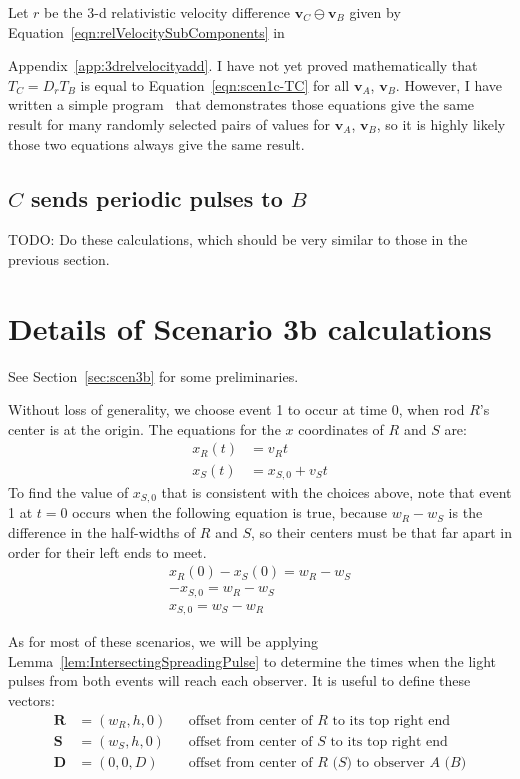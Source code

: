 \documentclass[a4paper]{article}
\theoremstyle{plain}
\theoremstyle{definition}
\newcommand{\vect}[1]{\mathbf{#1}}
\begin{document}
Let $r$ be the 3-d relativistic velocity difference
$\vect{v}_C \ominus \vect{v}_B$ given by
Equation~\eqref{eqn:relVelocitySubComponents} in

Appendix~\ref{app:3drelvelocityadd}.  I have not yet proved
mathematically that $T_C = D_r T_B$ is equal to
Equation~\eqref{eqn:scen1c-TC} for all $\vect{v}_A$, $\vect{v}_B$.
However, I have written a simple
program~\cite{FingerhutScenario1c-program} that demonstrates those
equations give the same result for many randomly selected pairs of
values for $\vect{v}_A$, $\vect{v}_B$, so it is highly likely those
two equations always give the same result.


\subsection{$C$ sends periodic pulses to $B$}
\label{app:scen1c-Csending}

TODO: Do these calculations, which should be very similar to those in
the previous section.


\section{Details of Scenario 3b calculations}
\label{app:scen3b}

See Section~\ref{sec:scen3b} for some preliminaries.

Without loss of generality, we choose event 1 to occur at time 0, when
rod $R$'s center is at the origin.  The equations for the $x$
coordinates of $R$ and $S$ are:
\begin{align*}
  x_R(t) & = v_R t \\
  x_S(t) & = x_{S,0} + v_S t
\end{align*}
To find the value of $x_{S,0}$ that is consistent with the choices
above, note that event 1 at $t=0$ occurs when the following equation
is true, because $w_R - w_S$ is the difference in the half-widths of
$R$ and $S$, so their centers must be that far apart in order for
their left ends to meet.
\begin{align*}
x_R(0) - x_S(0) = w_R - w_S \\
-x_{S,0} = w_R - w_S \\
x_{S,0} = w_S - w_R
\end{align*}

As for most of these scenarios, we will be applying
Lemma~\ref{lem:IntersectingSpreadingPulse} to determine the times when
the light pulses from both events will reach each observer.
It is useful to define these vectors:
\begin{align}
\vect{R} & = (w_R, h, 0) & & \text{offset from center of $R$ to its top right end} \\
\vect{S} & = (w_S, h, 0) & & \text{offset from center of $S$ to its top right end} \\
\vect{D} & = (0, 0, D) & & \text{offset from center of $R$ ($S$) to observer $A$ ($B$)}
\end{align}
\end{document}
